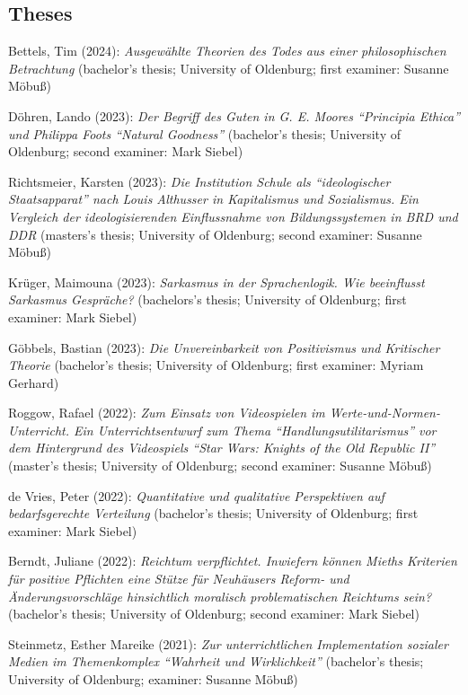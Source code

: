 \documentclass[a4paper,10pt]{article}
\newenvironment{literature}{%
   \parskip6pt\parindent0pt\raggedright
   \def\lititem{\hangindent=1cm\hangafter1}}{%
   \par\ignorespaces}
\begin{document}
\subsection*{Theses}
\begin{literature}
\lititem Bettels, Tim (2024): \textit{Ausgewählte Theorien des Todes aus einer philosophischen Betrachtung} (bachelor's thesis; University of Oldenburg; first examiner: Susanne Möbuß)

\lititem Döhren, Lando (2023): \textit{Der Begriff des Guten in G. E. Moores \enquote{Principia Ethica} und Philippa Foots \enquote{Natural Goodness}} (bachelor's thesis; University of Oldenburg; second examiner: Mark Siebel)

\lititem Richtsmeier, Karsten (2023): \textit{Die Institution Schule als \enquote{ideologischer Staatsapparat} nach Louis Althusser in Kapitalismus und Sozialismus. Ein Vergleich der ideologisierenden Einflussnahme von Bildungssystemen in BRD und DDR} (masters's thesis; University of Oldenburg; second examiner: Susanne Möbuß)

\lititem Krüger, Maimouna (2023): \textit{Sarkasmus in der Sprachenlogik. Wie beeinflusst Sarkasmus Gespräche?} (bachelors's thesis; University of Oldenburg; first examiner: Mark Siebel)

\lititem Göbbels, Bastian (2023): \textit{Die Unvereinbarkeit von Positivismus und Kritischer Theorie} (bachelor's thesis; University of Oldenburg; first examiner: Myriam Gerhard)

\lititem Roggow, Rafael (2022): \textit{Zum Einsatz von Videospielen im Werte-und-Normen-Unterricht. Ein Unterrichtsentwurf zum Thema \enquote{Handlungsutilitarismus} vor dem Hintergrund des Videospiels \enquote{Star Wars: Knights of the Old Republic II}} (master's thesis; University of Oldenburg; second examiner: Susanne Möbuß)

\lititem de Vries, Peter (2022): \textit{Quantitative und qualitative Perspektiven auf bedarfsgerechte Verteilung} (bachelor's thesis; University of Oldenburg; first examiner: Mark Siebel)

\lititem Berndt, Juliane (2022): \textit{Reichtum verpflichtet. Inwiefern können Mieths Kriterien für positive Pflichten eine Stütze für Neuhäusers Reform- und Änderungsvorschläge hinsichtlich moralisch problematischen Reichtums sein?} (bachelor's thesis; University of Oldenburg; second examiner: Mark Siebel)

\lititem Steinmetz, Esther Mareike (2021): \textit{Zur unterrichtlichen Implementation sozialer Medien im Themenkomplex \enquote{Wahrheit und Wirklichkeit}} (bachelor's thesis; University of Oldenburg; examiner: Susanne Möbuß)


\end{literature}
\end{document}
